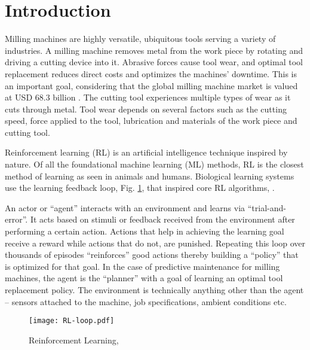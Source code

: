 \documentclass[referee, sn-mathphys-num]{sn-jnl}
\begin{document}
	\section{Introduction}
	
	Milling machines are highly versatile, ubiquitous tools serving a variety of industries. A milling machine removes metal from the work piece by rotating and driving a cutting device into it. Abrasive forces cause tool wear, and optimal tool replacement reduces direct costs and optimizes the machines' downtime. This is an important goal, considering that the global milling machine market is valued at USD 68.3 billion \cite{milling-market}. The cutting tool experiences multiple types of wear as it cuts through metal. Tool wear depends on several factors such as the cutting speed, force applied to the tool, lubrication and materials of the work piece and cutting tool. 
	
	Reinforcement learning (RL) is an artificial intelligence technique inspired by nature. Of all the foundational machine learning (ML) methods, RL is the closest method of learning as seen in animals and humans. Biological learning systems use the learning feedback loop, Fig. \ref{fig_RL-loop}, that inspired core RL algorithms, \cite{barto2018}.
	
	An actor or ``agent'' interacts with an environment and learns via ``trial-and-error''. It acts based on stimuli or feedback received from the environment after performing a certain action. Actions that help in achieving the learning goal receive a reward while actions that do not, are punished. Repeating this loop over thousands of episodes ``reinforces'' good actions thereby building a ``policy'' that is optimized for that goal. In the case of predictive maintenance for milling machines, the agent is the ``planner'' with a goal of learning an optimal tool replacement policy. The environment is technically anything other than the agent -- sensors attached to the machine, job specifications, ambient conditions etc.
	\begin{figure}[h]
		\centering
		\texttt{[image: RL-loop.pdf]}
		\caption{Reinforcement Learning, \cite{barto2018}}
		\label{fig_RL-loop}
	\end{figure}
	
\end{document}
